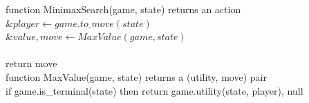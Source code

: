 \documentclass[preview]{standalone}
\begin{document}
\begin{center}
function MinimaxSearch(game, state) returns an action\\&$player \gets game.to\_move(state)$\\&$value, move \gets MaxValue(game, state)$\\\\return move\\function MaxValue(game, state) returns a (utility, move) pair\\if game.is\_terminal(state) then return game.utility(state, player), null
\end{center}
\end{document}
